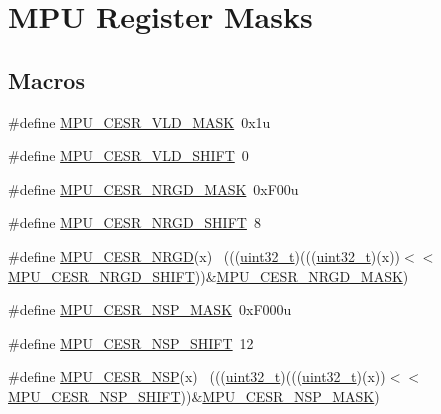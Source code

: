 \hypertarget{group___m_p_u___register___masks}{}\section{M\+PU Register Masks}
\label{group___m_p_u___register___masks}
\subsection*{Macros}
\begin{DoxyCompactItemize}
\item 
\#define \hyperlink{group___m_p_u___register___masks_ga97170048bb44b005879eac9ef8db2c14}{M\+P\+U\+\_\+\+C\+E\+S\+R\+\_\+\+V\+L\+D\+\_\+\+M\+A\+SK}~0x1u
\item 
\#define \hyperlink{group___m_p_u___register___masks_ga78bad194c9de3bebb9eba101cf58c613}{M\+P\+U\+\_\+\+C\+E\+S\+R\+\_\+\+V\+L\+D\+\_\+\+S\+H\+I\+FT}~0
\item 
\#define \hyperlink{group___m_p_u___register___masks_gab2bc6f6060eddc0403a79f7f5e31f270}{M\+P\+U\+\_\+\+C\+E\+S\+R\+\_\+\+N\+R\+G\+D\+\_\+\+M\+A\+SK}~0x\+F00u
\item 
\#define \hyperlink{group___m_p_u___register___masks_ga30493ea4dcacc6d2bf116459dd57362e}{M\+P\+U\+\_\+\+C\+E\+S\+R\+\_\+\+N\+R\+G\+D\+\_\+\+S\+H\+I\+FT}~8
\item 
\#define \hyperlink{group___m_p_u___register___masks_ga7409b2905721fcdbd64058717f0f97af}{M\+P\+U\+\_\+\+C\+E\+S\+R\+\_\+\+N\+R\+GD}(x)                                              ~(((\hyperlink{_p_e___types_8h_a33594304e786b158f3fb30289278f5af}{uint32\+\_\+t})(((\hyperlink{_p_e___types_8h_a33594304e786b158f3fb30289278f5af}{uint32\+\_\+t})(x))$<$$<$\hyperlink{group___m_p_u___register___masks_ga30493ea4dcacc6d2bf116459dd57362e}{M\+P\+U\+\_\+\+C\+E\+S\+R\+\_\+\+N\+R\+G\+D\+\_\+\+S\+H\+I\+FT}))\&\hyperlink{group___m_p_u___register___masks_gab2bc6f6060eddc0403a79f7f5e31f270}{M\+P\+U\+\_\+\+C\+E\+S\+R\+\_\+\+N\+R\+G\+D\+\_\+\+M\+A\+SK})
\item 
\#define \hyperlink{group___m_p_u___register___masks_gadfa15098e24cc47d3c919a4a50702050}{M\+P\+U\+\_\+\+C\+E\+S\+R\+\_\+\+N\+S\+P\+\_\+\+M\+A\+SK}~0x\+F000u
\item 
\#define \hyperlink{group___m_p_u___register___masks_ga3c9da72b898ef6552faa993528e58157}{M\+P\+U\+\_\+\+C\+E\+S\+R\+\_\+\+N\+S\+P\+\_\+\+S\+H\+I\+FT}~12
\item 
\#define \hyperlink{group___m_p_u___register___masks_ga5639f383deeba2d71767b811cb8998da}{M\+P\+U\+\_\+\+C\+E\+S\+R\+\_\+\+N\+SP}(x)                                                ~(((\hyperlink{_p_e___types_8h_a33594304e786b158f3fb30289278f5af}{uint32\+\_\+t})(((\hyperlink{_p_e___types_8h_a33594304e786b158f3fb30289278f5af}{uint32\+\_\+t})(x))$<$$<$\hyperlink{group___m_p_u___register___masks_ga3c9da72b898ef6552faa993528e58157}{M\+P\+U\+\_\+\+C\+E\+S\+R\+\_\+\+N\+S\+P\+\_\+\+S\+H\+I\+FT}))\&\hyperlink{group___m_p_u___register___masks_gadfa15098e24cc47d3c919a4a50702050}{M\+P\+U\+\_\+\+C\+E\+S\+R\+\_\+\+N\+S\+P\+\_\+\+M\+A\+SK})

\end{DoxyCompactItemize}
